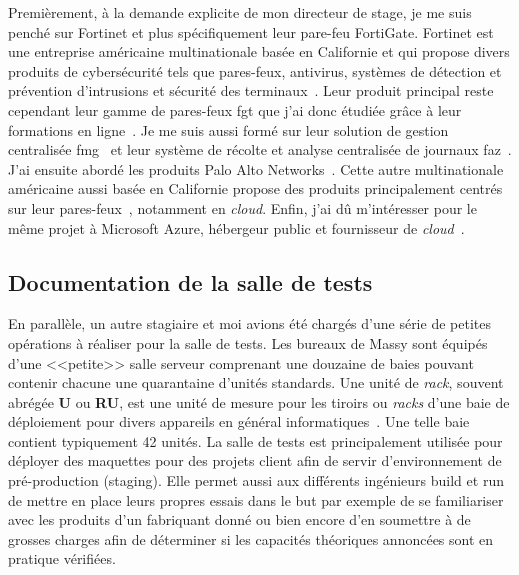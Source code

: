 \documentclass[12pt, oneside, a4paper, titlepage]{report}
\begin{document}
Premièrement, à la demande explicite de mon directeur de stage, je me suis
penché sur Fortinet et plus spécifiquement leur pare-feu FortiGate.  Fortinet
est une entreprise américaine multinationale basée en Californie et qui propose
divers produits de cybersécurité tels que pares-feux, antivirus, systèmes de
détection et prévention d'intrusions et sécurité des terminaux~\cite{forti}.
Leur produit principal reste cependant leur gamme de pares-feux \gls{fgt} que
j'ai donc étudiée grâce à leur formations en ligne~\cite{fgt}. Je me suis aussi
formé sur leur solution de gestion centralisée \gls{fmg}~\cite{fmg} et leur
système de récolte et analyse centralisée de journaux \gls{faz}~\cite{faz}. J'ai
ensuite abordé les produits Palo Alto Networks~\cite{pan}. Cette autre
multinationale américaine aussi basée en Californie propose des produits
principalement centrés sur leur pares-feux~\cite{pan-pa}, notamment en
\textit{cloud}. Enfin, j'ai dû m'intéresser pour le même projet à Microsoft
Azure, hébergeur public et fournisseur de \textit{cloud}~\cite{azure}.

\subsection{Documentation de la salle de tests}%
\label{sub:mission::prems::doc-salle-tests}

En parallèle, un autre stagiaire et moi avions été chargés d'une série de
petites opérations à réaliser pour la salle de tests. Les bureaux de Massy sont
équipés d'une <<petite>> salle serveur comprenant une douzaine de baies pouvant
contenir chacune une quarantaine d'unités standards. Une unité de \textit{rack},
souvent abrégée \textbf{U} ou \textbf{RU}, est une unité de mesure pour les
tiroirs ou \textit{racks} d'une baie de déploiement pour divers appareils en
général informatiques~\cite{rack-unit}. Une telle baie contient typiquement 42
unités. La salle de tests est principalement utilisée pour déployer des
maquettes pour des projets client afin de servir d'environnement de
pré-production (\gls{staging}).  Elle permet aussi aux différents ingénieurs
\gls{build} et \gls{run} de mettre en place leurs propres essais dans le but par
exemple de se familiariser avec les produits d'un fabriquant donné ou bien
encore d'en soumettre à de grosses charges afin de déterminer si les capacités
théoriques annoncées sont en pratique vérifiées.
\end{document}
